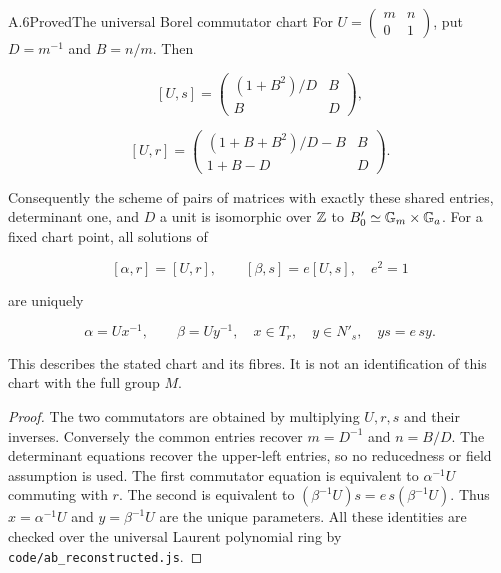 \begin{statement}{A.6}{Proved}{The universal Borel commutator chart}
For
$U=\left(\begin{smallmatrix}m&n\\0&1\end{smallmatrix}\right)$,
put $D=m^{-1}$ and $B=n/m$. Then

$$
[U,s]=
 \begin{pmatrix}(1+B^2)/D&B\\B&D\end{pmatrix},
$$


$$
[U,r]=
 \begin{pmatrix}(1+B+B^2)/D-B&B\\1+B-D&D\end{pmatrix}.
$$

Consequently the scheme of pairs of matrices with exactly these
shared entries, determinant one, and $D$ a unit is isomorphic
over $\mathbb Z$ to $B'_0\simeq\mathbb G_m\times\mathbb G_a$.
For a fixed chart point, all solutions of

$$
[\alpha,r]=[U,r],\qquad [\beta,s]=e[U,s],\quad e^2=1
$$

are uniquely

$$
\alpha=Ux^{-1},\qquad \beta=Uy^{-1},
 \quad x\in T_r,\quad y\in N'_s,\quad ys=e\,sy.
$$

This describes the stated chart and its fibres. It is not
an identification of this chart with the full group $M$.
\end{statement}
\begin{proof}
The two commutators are obtained by multiplying $U,r,s$
and their inverses. Conversely the common entries recover
$m=D^{-1}$ and $n=B/D$. The determinant equations recover
the upper-left entries, so no reducedness or field assumption
is used.
The first commutator equation is equivalent to
$\alpha^{-1}U$ commuting with $r$.
The second is equivalent to
$(\beta^{-1}U)s=e\,s(\beta^{-1}U)$.
Thus $x=\alpha^{-1}U$ and $y=\beta^{-1}U$ are the unique
parameters. All these identities are checked over the
universal Laurent polynomial ring by
\texttt{code/ab\_reconstructed.js}.
\end{proof}

